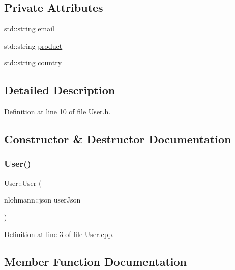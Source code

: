 \subsection*{Private Attributes}
\begin{DoxyCompactItemize}
\item 
std\+::string \mbox{\hyperlink{class_user_ac35b7c63228119cb91acdbd7ed32b8cb}{email}}
\item 
std\+::string \mbox{\hyperlink{class_user_a5f969245b125e607f44b1702e58df86e}{product}}
\item 
std\+::string \mbox{\hyperlink{class_user_ad381c7059c4b6104805f78e9a16e3316}{country}}
\end{DoxyCompactItemize}


\subsection{Detailed Description}


Definition at line 10 of file User.\+h.



\subsection{Constructor \& Destructor Documentation}
\mbox{\label{class_user_a75e2d36bce1933dcb0b9678bc2f0f0cf}} 
\subsubsection{\texorpdfstring{User()}{User()}}
{\footnotesize\ttfamily User\+::\+User (\begin{DoxyParamCaption}\item[{nlohmann\+::json}]{user\+Json }\end{DoxyParamCaption})}



Definition at line 3 of file User.\+cpp.



\subsection{Member Function Documentation}
\mbox{\label{class_user_a1e3ff9d405c551739d14994463b2f7f6}} 
